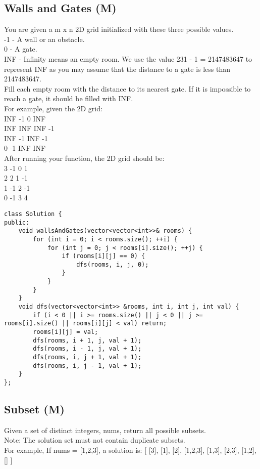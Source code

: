 \subsection{Walls and Gates (M)}
You are given a m x n 2D grid initialized with these three possible values.\\
    -1 - A wall or an obstacle.\\
    0 - A gate.\\
    INF - Infinity means an empty room. We use the value 231 - 1 = 2147483647 to represent INF as you may assume that the distance to a gate is less than 2147483647.\\

Fill each empty room with the distance to its nearest gate. If it is impossible to reach a gate, it should be filled with INF.\\

For example, given the 2D grid:\\
INF  -1  0  INF\\
INF INF INF  -1\\
INF  -1 INF  -1\\
  0  -1 INF INF\\

After running your function, the 2D grid should be:\\
  3  -1   0   1\\
  2   2   1  -1\\
  1  -1   2  -1\\
  0  -1   3   4\\

\begin{lstlisting}
class Solution {
public:
    void wallsAndGates(vector<vector<int>>& rooms) {
        for (int i = 0; i < rooms.size(); ++i) {
            for (int j = 0; j < rooms[i].size(); ++j) {
                if (rooms[i][j] == 0) {
                    dfs(rooms, i, j, 0);
                }
            }
        }
    }
    void dfs(vector<vector<int>> &rooms, int i, int j, int val) {
        if (i < 0 || i >= rooms.size() || j < 0 || j >= rooms[i].size() || rooms[i][j] < val) return;
        rooms[i][j] = val;
        dfs(rooms, i + 1, j, val + 1);
        dfs(rooms, i - 1, j, val + 1);
        dfs(rooms, i, j + 1, val + 1);
        dfs(rooms, i, j - 1, val + 1);
    }
};
\end{lstlisting}


\subsection{Subset (M)}
Given a set of distinct integers, nums, return all possible subsets.\\
Note: The solution set must not contain duplicate subsets.\\
For example,
If nums = [1,2,3], a solution is:
[
  [3],
  [1],
  [2],
  [1,2,3],
  [1,3],
  [2,3],
  [1,2],
  []
]\\


